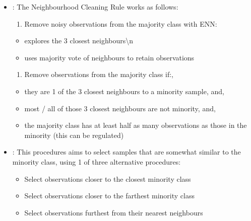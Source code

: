\documentclass[letterpaper,10pt,english]{jupyterBook}
\begin{document}
\begin{itemize}
\item {} 
\sphinxAtStartPar
{}: The Neighbourhood Cleaning Rule works as follows:
\begin{enumerate}
%
\item {} 
\sphinxAtStartPar
Remove noisy observations from the majority class with ENN:

\end{enumerate}
\begin{itemize}
\item {} 
\sphinxAtStartPar
explores the 3 closest neighbours\textbackslash{}n

\item {} 
\sphinxAtStartPar
uses majority vote of neighbours to retain observations

\end{itemize}
\begin{enumerate}
%
\item {} 
\sphinxAtStartPar
Remove observations from the majority class if:,

\end{enumerate}
\begin{itemize}
\item {} 
\sphinxAtStartPar
they are 1 of the 3 closest neighbours to a minority sample, and,

\item {} 
\sphinxAtStartPar
most / all of those 3 closest neighbours are not minority, and,

\item {} 
\sphinxAtStartPar
the majority class has at least half as many observations as those in the minority (this can be regulated)

\end{itemize}

\item {} 
\sphinxAtStartPar
{}: This procedures aims to select samples that are somewhat similar to the minority class, using 1 of three alternative procedures:
\begin{itemize}
\item {} 
\sphinxAtStartPar
Select observations closer to the closest minority class

\item {} 
\sphinxAtStartPar
Select observations closer to the farthest minority class

\item {} 
\sphinxAtStartPar
Select observations furthest from their nearest neighbours

\end{itemize}

\end{itemize}
\end{document}
